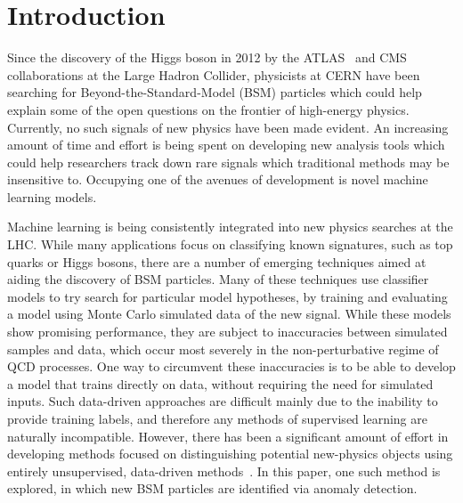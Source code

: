 \documentclass[12pt, a4paper]{article}
\begin{document}
\clearpage







\section{Introduction}

Since the discovery of the Higgs boson in 2012 by the ATLAS~\cite{atlas_higgs} and CMS~\cite{cms_higgs} collaborations at the Large Hadron Collider, physicists at CERN have been searching for Beyond-the-Standard-Model (BSM) particles which could help explain some of the open questions on the frontier of high-energy physics. 
Currently, no such signals of new physics have been made evident. 
An increasing amount of time and effort is being spent on developing new analysis tools which could help researchers track down rare signals which traditional methods may be insensitive to. 
Occupying one of the avenues of development is novel machine learning models.

Machine learning is being consistently integrated into new physics searches at the LHC. 
While many applications focus on classifying known signatures, such as top quarks or Higgs bosons, there are a number of emerging techniques aimed at aiding the discovery of BSM particles. 
Many of these techniques use classifier models to try search for particular model hypotheses, by training and evaluating a model using Monte Carlo simulated data of the new signal.
While these models show promising performance, they are subject to inaccuracies between simulated samples and data, which occur most severely in the non-perturbative regime of QCD processes.
One way to circumvent these inaccuracies is to be able to develop a model that trains directly on data, without requiring the need for simulated inputs.
Such data-driven approaches are difficult mainly due to the inability to provide training labels, and therefore any methods of supervised learning are naturally incompatible.
However, there has been a significant amount of effort in developing methods focused on distinguishing potential new-physics objects using entirely unsupervised, data-driven methods~\cite{CWoLa}.
In this paper, one such method is explored, in which new BSM particles are identified via anomaly detection.
\end{document}
